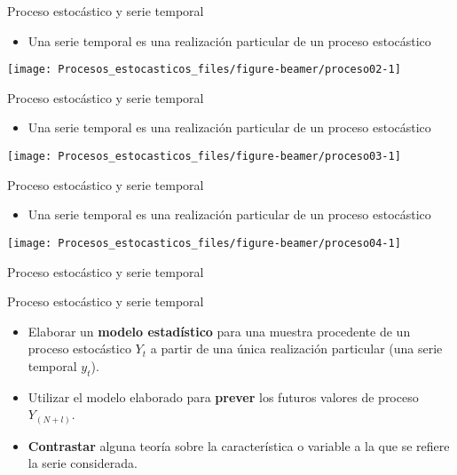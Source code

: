\documentclass[ignorenonframetext,]{beamer}
\providecommand{\tightlist}{%
  \setlength{\itemsep}{0pt}\setlength{\parskip}{0pt}}
\begin{document}
\begin{frame}{Proceso estocástico y serie temporal}

\begin{itemize}
\tightlist
\item
  Una serie temporal es una realización particular de un proceso
  estocástico
\end{itemize}

\begin{center}\texttt{[image: Procesos\_estocasticos\_files/figure-beamer/proceso02-1]} \end{center}

\end{frame}

\begin{frame}{Proceso estocástico y serie temporal}

\begin{itemize}
\tightlist
\item
  Una serie temporal es una realización particular de un proceso
  estocástico
\end{itemize}

\begin{center}\texttt{[image: Procesos\_estocasticos\_files/figure-beamer/proceso03-1]} \end{center}

\end{frame}

\begin{frame}{Proceso estocástico y serie temporal}

\begin{itemize}
\tightlist
\item
  Una serie temporal es una realización particular de un proceso
  estocástico
\end{itemize}

\begin{center}\texttt{[image: Procesos\_estocasticos\_files/figure-beamer/proceso04-1]} \end{center}

\end{frame}

\begin{frame}{Proceso estocástico y serie temporal}

\end{frame}

\begin{frame}{Proceso estocástico y serie temporal}

\begin{itemize}
\item
  Elaborar un \textbf{modelo estadístico} para una muestra procedente de
  un proceso estocástico \(Y_t\) a partir de una única realización
  particular (una serie temporal \(y_t\)).
\item
  Utilizar el modelo elaborado para \textbf{prever} los futuros valores
  de proceso \(Y_{(N+l)}\).
\item
  \textbf{Contrastar} alguna teoría sobre la característica o variable a
  la que se refiere la serie considerada.
\end{itemize}

\end{frame}
\end{document}

